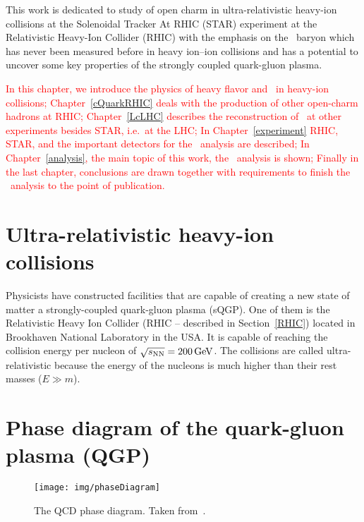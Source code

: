 This work is dedicated to study of open charm in ultra-relativistic heavy-ion collisions at the Solenoidal Tracker At RHIC (STAR) experiment at the Relativistic Heavy-Ion Collider (RHIC) with the emphasis on the \Lambdac\ baryon which has never been measured before in heavy ion--ion collisions and has a potential to uncover some key properties of the strongly coupled quark-gluon plasma.

\textcolor{red}{In this chapter, we introduce the physics of heavy flavor and \Lambdac\ in heavy-ion collisions; Chapter~\ref{cQuarkRHIC} deals with the production of other open-charm hadrons at RHIC\@; Chapter~\ref{LcLHC} describes the reconstruction of \Lambdac\ at other experiments besides STAR, i.e.\ at the LHC\@; In Chapter~\ref{experiment} RHIC, STAR, and the important detectors for the \Lambdac\ analysis are described; In Chapter~\ref{analysis}, the main topic of this work, the \Lambdac\ analysis is shown; Finally in the last chapter, conclusions are drawn together with requirements to finish the \Lambdac\ analysis to the point of publication.}

\section{Ultra-relativistic heavy-ion collisions}

Physicists have constructed facilities that are capable of creating a new state of matter a strongly-coupled quark-gluon plasma (sQGP). One of them is the Relativistic Heavy Ion Collider (RHIC -- described in Section~\ref{RHIC}) located in Brookhaven National Laboratory in the USA\@. It is capable of reaching the collision energy per nucleon of $\sqrt{s_\text{NN}}= \SI{200}{\giga\electronvolt}$. The collisions are called ultra-relativistic because the energy of the nucleons is much higher than their rest masses ($E \gg m$).

\section{Phase diagram of the quark-gluon plasma (QGP)}

\begin{figure}[!htb]
\centering
\texttt{[image: img/phaseDiagram]}
\caption{The QCD phase diagram. Taken from~\cite{bnlSite}.}
\label{fig:phaseDiagram}
\end{figure}
 

